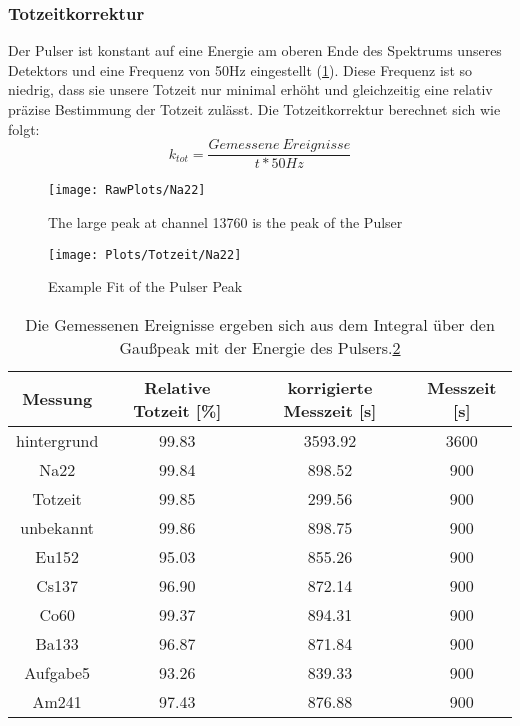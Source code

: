 \documentclass[]{article}
\begin{document}
\subsubsection{Totzeitkorrektur} 
Der Pulser ist konstant auf eine Energie am oberen Ende des Spektrums unseres Detektors und eine Frequenz von 50Hz eingestellt (\ref{fig:rawNa22}). Diese Frequenz ist so niedrig, dass sie unsere Totzeit nur minimal erhöht und gleichzeitig eine relativ präzise Bestimmung der Totzeit zulässt. Die Totzeitkorrektur berechnet sich wie folgt:
\begin{equation}
	k_{tot}=\frac{Gemessene \: Ereignisse}{t*50Hz}
\end{equation}
\begin{figure}
	\centering
	\texttt{[image: RawPlots/Na22]}
	\caption{The large peak at channel 13760 is the peak of the Pulser}
	\label{fig:rawNa22}
\end{figure}
\begin{figure}
	\centering
	\texttt{[image: Plots/Totzeit/Na22]}
	\caption{Example Fit of the Pulser Peak}
	\label{fig:DeadTimena22}
\end{figure}

\begin{table}[H]
	\centering
	\begin{tabular}{|c|c|c|c|}
		\hline
		Messung & Relative Totzeit [\%] & korrigierte Messzeit [s] & Messzeit [s] \\ \hline\hline
		hintergrund & 99.83 & 3593.92 & 3600 \\ \hline
		Na22 & 99.84 & 898.52 & 900 \\ \hline
		Totzeit & 99.85 & 299.56 & 900 \\ \hline
		unbekannt & 99.86 & 898.75 & 900 \\ \hline
		Eu152 & 95.03 & 855.26 & 900 \\ \hline
		Cs137 & 96.90 & 872.14 & 900 \\ \hline
		Co60 & 99.37 & 894.31 & 900 \\ \hline
		Ba133 & 96.87 & 871.84 & 900 \\ \hline
		Aufgabe5 & 93.26 & 839.33 & 900 \\ \hline
		Am241 & 97.43 & 876.88 & 900 \\ \hline
		\hline
	\end{tabular}
	\caption{Die Gemessenen Ereignisse ergeben sich aus dem Integral über den Gaußpeak mit der Energie des Pulsers.\ref{fig:DeadTimena22} \label{}}
\end{table}
\end{document}
